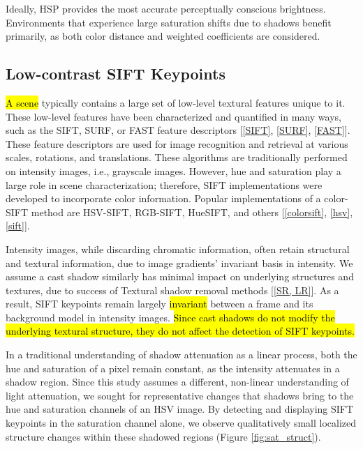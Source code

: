 \documentclass[12pt]{report}
\begin{document}
Ideally, HSP provides the most accurate perceptually conscious brightness. Environments that experience large saturation shifts due to shadows benefit primarily, as both color distance and weighted coefficients are considered.

\subsection{Low-contrast SIFT Keypoints} \label{section:lowcSIFT}

\hl{A scene} typically contains a large set of low-level textural features unique to it. These low-level features have been characterized and quantified in many ways, such as the SIFT, SURF, or FAST feature descriptors [\ref{SIFT}, \ref{SURF}, \ref{FAST}]. These feature descriptors are used for image recognition and retrieval at various scales, rotations, and translations. These algorithms are traditionally performed on intensity images, i.e., grayscale images. However, hue and saturation play a large role in scene characterization; therefore, SIFT implementations were developed to incorporate color information. Popular implementations of a color-SIFT method are HSV-SIFT, RGB-SIFT, HueSIFT, and others [\ref{colorsift}, \ref{hsv}, \ref{sift}].

Intensity images, while discarding chromatic information, often retain structural and textural information, due to image gradients' invariant basis in intensity. We assume a cast shadow similarly has minimal impact on underlying structures and textures, due to success of Textural shadow removal methods [\ref{SR, LR}]. As a result, SIFT keypoints remain largely \hl{invariant} between a frame and its background model in intensity images. \hl{Since cast shadows do not modify the underlying textural structure, they do not affect the detection of SIFT keypoints.}

In a traditional understanding of shadow attenuation as a linear process, both the hue and saturation of a pixel remain constant, as the intensity attenuates in a shadow region. Since this study assumes a different, non-linear understanding of light attenuation, we sought for representative changes that shadows bring to the hue and saturation channels of an HSV image. By detecting and displaying SIFT keypoints in the saturation channel alone, we observe qualitatively small localized structure changes within these shadowed regions (Figure \ref{fig:sat_struct}).
\end{document}
